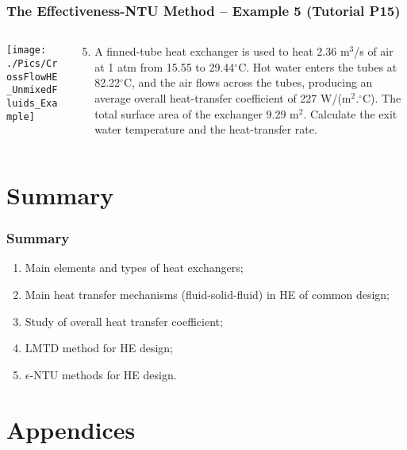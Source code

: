 \documentclass[10pt,compress,unknownkeysallowed]{beamer}
\begin{document}
\begin{frame}
  \frametitle{ The Effectiveness-NTU Method -- Example 5 (Tutorial P15)}
    \begin{columns}
       \begin{column}[l]{0.58\linewidth}
         \texttt{[image: ./Pics/CrossFlowHE\_UnmixedFluids\_Example]}
       \end{column}
       \begin{column}[l]{0.42\linewidth}
          \begin{enumerate}\setcounter{enumi}{4}
              \item A finned-tube heat exchanger is used to heat 2.36 m$^{3}$/s of air at 1 atm from 15.55 to 29.44$^{\circ}$C. Hot water enters the tubes at 82.22$^{\circ}$C, and the air flows across the tubes, producing an average overall heat-transfer coefficient of 227 W/(m$^{2}$.$^{\circ}$C). The total surface area of the exchanger 9.29 m$^{2}$. Calculate the exit water temperature and the heat-transfer rate.
          \end{enumerate}
       \end{column}      
    \end{columns}
\end{frame}



\section{Summary}


\begin{frame}
  \frametitle{Summary}
    \begin{enumerate}
       \item Main elements and types of heat exchangers;
       \item Main heat transfer mechanisms (fluid-solid-fluid) in HE of common design;
       \item Study of overall heat transfer coefficient;
       \item LMTD method for HE design;
       \item $\epsilon$-NTU methods for HE design.
    \end{enumerate}
\end{frame}








\section{Appendices}
\end{document}
